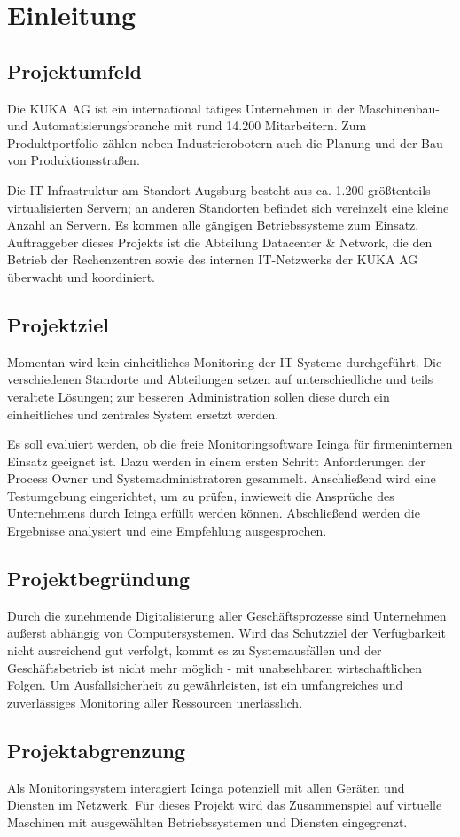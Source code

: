 \section{Einleitung}
\label{sec:Einleitung}

\subsection{Projektumfeld} 
\label{sec:Projektumfeld}
Die KUKA AG ist ein international tätiges Unternehmen in der Maschinenbau- und Automatisierungsbranche mit rund 14.200 Mitarbeitern. Zum Produktportfolio zählen neben
Industrierobotern auch die Planung und der Bau von Produktionsstraßen.

Die IT-Infrastruktur am Standort Augsburg besteht aus ca. 1.200 größtenteils virtualisierten Servern; an anderen Standorten befindet sich vereinzelt eine kleine Anzahl an Servern.
Es kommen alle gängigen Betriebssysteme zum Einsatz. Auftraggeber dieses Projekts ist die Abteilung \glqq Datacenter \& Network\grqq{}, die den Betrieb der Rechenzentren sowie des
internen IT-Netzwerks der KUKA AG überwacht und koordiniert.

\subsection{Projektziel} 
\label{sec:Projektziel}
Momentan wird kein einheitliches Monitoring der IT-Systeme durchgeführt. Die verschiedenen Standorte und Abteilungen setzen auf unterschiedliche und teils veraltete Lösungen; zur
besseren Administration sollen diese durch ein einheitliches und zentrales System ersetzt werden.

Es soll evaluiert werden, ob die freie Monitoringsoftware \glqq Icinga\grqq{} für firmeninternen Einsatz geeignet ist. Dazu werden in einem ersten Schritt Anforderungen der Process
Owner und Systemadministratoren gesammelt. Anschließend wird eine Testumgebung eingerichtet, um zu prüfen, inwieweit die Ansprüche des Unternehmens durch \glqq Icinga\grqq{}
erfüllt werden können. Abschließend werden die Ergebnisse analysiert und eine Empfehlung ausgesprochen.

\subsection{Projektbegründung} 
\label{sec:Projektbegruendung}
Durch die zunehmende Digitalisierung aller Geschäftsprozesse sind Unternehmen äußerst abhängig von Computersystemen. Wird das Schutzziel der Verfügbarkeit nicht ausreichend gut
verfolgt, kommt es zu Systemausfällen und der Geschäftsbetrieb ist nicht mehr möglich - mit unabsehbaren wirtschaftlichen Folgen. Um Ausfallsicherheit zu gewährleisten, ist ein
umfangreiches und zuverlässiges Monitoring aller Ressourcen unerlässlich.

\subsection{Projektabgrenzung} 
\label{sec:Projektabgrenzung}
Als Monitoringsystem interagiert \glqq Icinga\grqq{} potenziell mit allen Geräten und Diensten im Netzwerk. Für dieses Projekt wird das Zusammenspiel auf virtuelle Maschinen mit
ausgewählten Betriebssystemen und Diensten eingegrenzt.